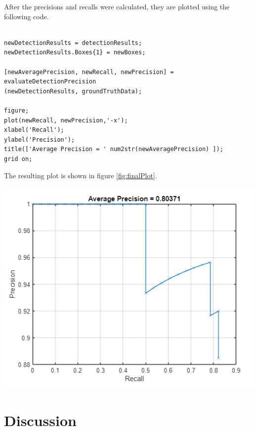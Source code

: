 \documentclass[man]{apa7}
\begin{document}
After the precisions and recalls were calculated, they are plotted using the following code.

\newpage

\begin{lstlisting}[]

newDetectionResults = detectionResults;
newDetectionResults.Boxes{1} = newBoxes;

[newAveragePrecision, newRecall, newPrecision] = evaluateDetectionPrecision
(newDetectionResults, groundTruthData);

figure;
plot(newRecall, newPrecision,'-x');
xlabel('Recall');
ylabel('Precision');
title(['Average Precision = ' num2str(newAveragePrecision) ]);
grid on;

\end{lstlisting}

The resulting plot is shown in figure \ref{fig:finalPlot}.

\newpage

\begin{minipage}{\linewidth}
  \includegraphics[height=\textheight/2,width=\textwidth/1]{figures/finalPrecRecPlot.png}
  \label{fig:finalPlot}
\end{minipage}

\newpage

\section{Discussion}
\end{document}
